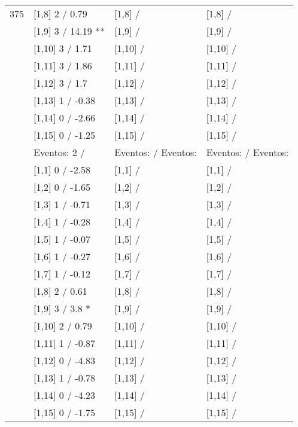 \begin{table}
\begin{tabular}[t]{llll}
375 & {}[1,8] 2  / 0.79 & {}[1,8]  / & {}[1,8]  /\\
\addlinespace
 & {}[1,9] 3  / 14.19 ** & {}[1,9]  / & {}[1,9]  /\\
 & {}[1,10] 3  / 1.71 & {}[1,10]  / & {}[1,10]  /\\
 & {}[1,11] 3  / 1.86 & {}[1,11]  / & {}[1,11]  /\\
 & {}[1,12] 3  / 1.7 & {}[1,12]  / & {}[1,12]  /\\
 & {}[1,13] 1  / -0.38 & {}[1,13]  / & {}[1,13]  /\\
\addlinespace
 & {}[1,14] 0  / -2.66 & {}[1,14]  / & {}[1,14]  /\\
 & {}[1,15] 0  / -1.25 & {}[1,15]  / & {}[1,15]  /\\
 & Eventos:  2 / & Eventos:   / Eventos: & Eventos:   / Eventos:\\
 & {}[1,1] 0  / -2.58 & {}[1,1]  / & {}[1,1]  /\\
 & {}[1,2] 0  / -1.65 & {}[1,2]  / & {}[1,2]  /\\
\addlinespace
 & {}[1,3] 1  / -0.71 & {}[1,3]  / & {}[1,3]  /\\
 & {}[1,4] 1  / -0.28 & {}[1,4]  / & {}[1,4]  /\\
 & {}[1,5] 1  / -0.07 & {}[1,5]  / & {}[1,5]  /\\
 & {}[1,6] 1  / -0.27 & {}[1,6]  / & {}[1,6]  /\\
 & {}[1,7] 1  / -0.12 & {}[1,7]  / & {}[1,7]  /\\
\addlinespace
500 & {}[1,8] 2  / 0.61 & {}[1,8]  / & {}[1,8]  /\\
 & {}[1,9] 3  / 3.8 * & {}[1,9]  / & {}[1,9]  /\\
 & {}[1,10] 2  / 0.79 & {}[1,10]  / & {}[1,10]  /\\
 & {}[1,11] 1  / -0.87 & {}[1,11]  / & {}[1,11]  /\\
 & {}[1,12] 0  / -4.83 & {}[1,12]  / & {}[1,12]  /\\
\addlinespace
 & {}[1,13] 1  / -0.78 & {}[1,13]  / & {}[1,13]  /\\
 & {}[1,14] 0  / -4.23 & {}[1,14]  / & {}[1,14]  /\\
 & {}[1,15] 0  / -1.75 & {}[1,15]  / & {}[1,15]  /\\
\bottomrule
\end{tabular}
\end{table}

